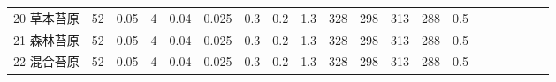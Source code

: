 \begin{landscape}
\begin{table}[htbp]
\begin{tabular}{@{}lccccccccccccccccccc@{}}
    20 草本苔原    & 52                                                                & 0.05                                                                                                   & 4                                                                                  & 0.04                                                                               & 0.025                                                               & 0.3                                                       & 0.2                                                       & 1.3                                                       & 328                                                             & 298                                                             & 313                                                              & 288                                                               & 0.5                                                          \\
    21 森林苔原    & 52                                                                & 0.05                                                                                                   & 4                                                                                  & 0.04                                                                               & 0.025                                                               & 0.3                                                       & 0.2                                                       & 1.3                                                       & 328                                                             & 298                                                             & 313                                                              & 288                                                               & 0.5                                                          \\
    22 混合苔原    & 52                                                                & 0.05                                                                                                   & 4                                                                                  & 0.04                                                                               & 0.025                                                               & 0.3                                                       & 0.2                                                       & 1.3                                                       & 328                                                             & 298                                                             & 313                                                              & 288                                                               & 0.5                                                          \\

\end{tabular}
\end{table}
\end{landscape}
